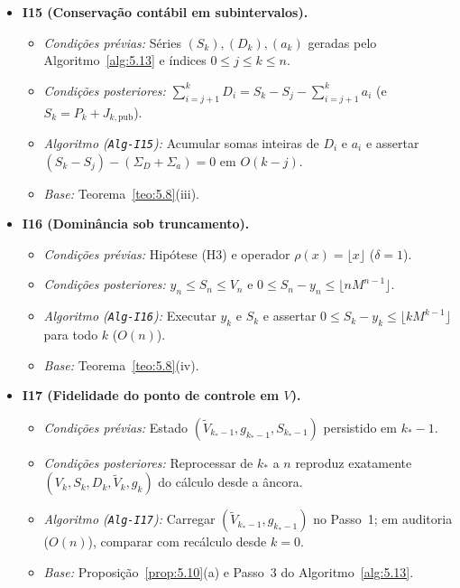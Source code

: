 \documentclass[11pt, a4paper]{article}
\theoremstyle{definition}
\theoremstyle{plain}
\theoremstyle{remark}
\begin{document}
\begin{itemize}
    \item \textbf{I15 (Conservação contábil em subintervalos).}
    \begin{itemize}
        \item \emph{Condições prévias:} Séries $(S_k), (D_k), (a_k)$ geradas pelo Algoritmo~\ref{alg:5.13} e índices $0 \le j \le k \le n$.
        \item \emph{Condições posteriores:} $\sum_{i=j+1}^k D_i = S_k - S_j - \sum_{i=j+1}^k a_i$ (e $S_k = P_k + J_{k,\text{pub}}$).
        \item \emph{Algoritmo (\texttt{Alg-I15}):} Acumular somas inteiras de $D_i$ e $a_i$ e assertar $(S_k - S_j) - (\Sigma_D + \Sigma_a) = 0$ em $O(k - j)$.
        \item \emph{Base:} Teorema~\ref{teo:5.8}(iii).
    \end{itemize}

    \item \textbf{I16 (Dominância sob truncamento).}
    \begin{itemize}
        \item \emph{Condições prévias:} Hipótese (H3) e operador $\rho(x) = \lfloor x \rfloor$ ($\delta = 1$).
        \item \emph{Condições posteriores:} $y_n \le S_n \le V_n$ e $0 \le S_n - y_n \le \lfloor n M^{n-1} \rfloor$.
        \item \emph{Algoritmo (\texttt{Alg-I16}):} Executar $y_k$ e $S_k$ e assertar $0 \le S_k - y_k \le \lfloor k M^{k-1} \rfloor$ para todo $k$ ($O(n)$).
        \item \emph{Base:} Teorema~\ref{teo:5.8}(iv).
    \end{itemize}

    \item \textbf{I17 (Fidelidade do ponto de controle em $V$).}
    \begin{itemize}
        \item \emph{Condições prévias:} Estado $(\tilde{V}_{k_* - 1}, g_{k_* - 1}, S_{k_* - 1})$ persistido em $k_* - 1$.
        \item \emph{Condições posteriores:} Reprocessar de $k_*$ a $n$ reproduz exatamente $(V_k, S_k, D_k, \tilde{V}_k, g_k)$ do cálculo desde a âncora.
        \item \emph{Algoritmo (\texttt{Alg-I17}):} Carregar $(\tilde{V}_{k_* - 1}, g_{k_* - 1})$ no Passo~1; em auditoria ($O(n)$), comparar com recálculo desde $k=0$.
        \item \emph{Base:} Proposição~\ref{prop:5.10}(a) e Passo~3 do Algoritmo~\ref{alg:5.13}.
    \end{itemize}


\end{itemize}
\end{document}

